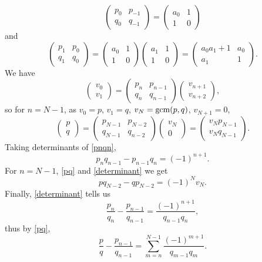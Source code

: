 \documentclass{article}
\newcommand{\gcm}{\ensuremath\mathrm{gcm}}
\begin{document}
\[
\begin{pmatrix}p_0&p_{-1}\\
q_0&q_{-1}
\end{pmatrix}
=\begin{pmatrix}a_0&1\\
1&0
\end{pmatrix}
\]
and
\[
\begin{pmatrix}p_1&p_0\\
q_1&q_0
\end{pmatrix}
=\begin{pmatrix}a_0&1\\
1&0
\end{pmatrix}\begin{pmatrix}a_1&1\\
1&0
\end{pmatrix}
=\begin{pmatrix}
a_0a_1+1&a_0\\
a_1&1
\end{pmatrix}.
\]
We have
\[
\begin{pmatrix}
v_0\\
v_1
\end{pmatrix}
=
\begin{pmatrix}
p_n&p_{n-1}\\
q_n&q_{n-1}
\end{pmatrix}
\begin{pmatrix}
v_{n+1}\\
v_{n+2}
\end{pmatrix},
\]
so for $n=N-1$, as $v_0=p$, $v_1=q$, $v_N=\gcm(p,q)$, $v_{N+1}=0$,
\begin{equation}
\begin{pmatrix}
p\\
q
\end{pmatrix}
=\begin{pmatrix}
p_{N-1}&p_{N-2}\\
q_{N-1}&q_{n-2}
\end{pmatrix}
\begin{pmatrix}
v_N\\
0
\end{pmatrix}
=\begin{pmatrix} v_N p_{N-1}\\
v_N q_{N-1}
\end{pmatrix}.
\label{pq}
\end{equation}
Taking determinants of \eqref{pnqn},
\begin{equation}
p_nq_{n-1}-p_{n-1}q_n = (-1)^{n+1}.
\label{determinant}
\end{equation}
For $n=N-1$,   \eqref{pq} and  \eqref{determinant} we get
\begin{equation}
p q_{N-2} - qp_{N-2} = (-1)^N v_N.
\label{linear}
\end{equation}
Finally,  \eqref{determinant} tells us
\[
\frac{p_n}{q_n} -  \frac{p_{n-1}}{q_{n-1}} = \frac{(-1)^{n+1}}{q_{n-1} q_n},
\]
thus by \eqref{pq},
\[
\frac{p}{q} -  \frac{p_{n-1}}{q_{n-1}} 
=\sum_{m=n}^{N-1}  \frac{(-1)^{m+1}}{q_{m-1} q_m}.
\]
\end{document}
